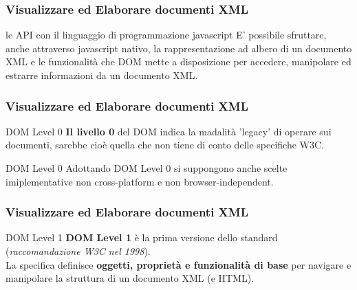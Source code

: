\begin{frame}
    \frametitle{Visualizzare ed Elaborare documenti XML}
    \addtocounter{nframe}{1}
    

     \begin{block}{le API con il linguaggio di programmazione javascript}
       E' possibile sfruttare, anche attraverso javascript nativo, la rappresentazione ad albero di un documento XML e le funzionalità che DOM mette a disposizione per accedere, manipolare ed estrarre informazioni da un documento XML.
     \end{block}
     
\end{frame}


\begin{frame}
    \frametitle{Visualizzare ed Elaborare documenti XML}
    \addtocounter{nframe}{1}
    

     \begin{block}{DOM Level 0}
       \textbf{Il livello 0} del DOM indica la madalità 'legacy' di operare sui documenti, sarebbe cioè quella che non tiene di conto delle specifiche W3C.
     \end{block}
     

     \begin{block}{DOM Level 0}
        Adottando DOM Level 0 si suppongono anche scelte imiplementative non cross-platform e non browser-independent.
      \end{block}

\end{frame}

\begin{frame}
    \frametitle{Visualizzare ed Elaborare documenti XML}
    \addtocounter{nframe}{1}
    

     \begin{block}{DOM Level 1}
       \textbf{DOM Level 1} è la prima versione dello standard (\textit{raccomandazione W3C nel 1998}). 
       \\ La specifica definisce  \textbf{oggetti, proprietà e funzionalità di base} per navigare e manipolare la struttura di un documento XML (e HTML).
     \end{block}

\end{frame}


